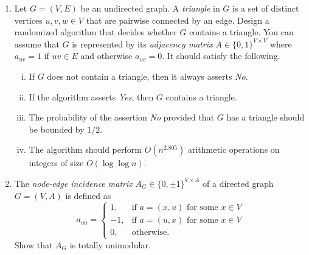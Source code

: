 \documentclass[11pt]{article}
\begin{document}
\begin{enumerate}[1)]
\item \label{triangle-detection} Let $G = (V,E)$ be an undirected graph. A \emph{triangle} in $G$ is a set of distinct vertices $u,v,w ∈ V$ that are pairwise connected by an edge.
  Design a randomized algorithm that decides whether $G$ contains a triangle. You can assume that $G$ is represented by its \emph{adjacency matrix} $A ∈ \{0,1\}^{V \times V}$ where  $a_{uv} = 1$ if $uv ∈E$ and otherwise $a_{uv} = 0$.  
  It should satisfy the following.
  \begin{enumerate}[i)] 
  \item If $G$ does not contain a triangle, then it always asserts \emph{No}.
  \item If the algorithm asserts \emph{Yes}, then $G$ contains a triangle.
  \item The probability of the assertion \emph{No} provided that $G$ has a triangle should be bounded by $1/2$.
  \item The algorithm should perform $O(n^{2.805})$ arithmetic operations on integers of size $O(\log \log n)$. 
  \end{enumerate}

\item The \emph{node-edge incidence matrix} $A_G ∈ \{0, \pm 1\}^{V \times A}$ of a directed graph $G = (V,A)$   is defined as
  \begin{displaymath}
    a_{ua} = \begin{cases}
      1, & \text{if  } a= (x,u) \text{ for some } x ∈V\\
      -1, & \text{if  } a= (u,x) \text{ for some } x ∈V\\
0, & \text{otherwise.}
    \end{cases}    
  \end{displaymath}
  Show that $A_G$ is totally unimodular. 
\end{enumerate}





  
\end{document}
